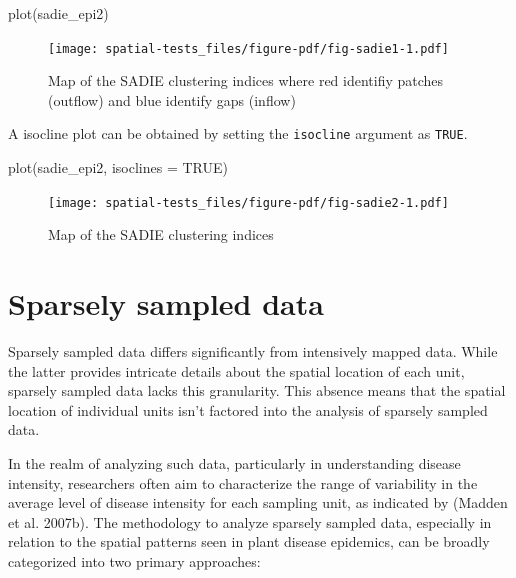 \documentclass[
  letterpaper,
]{book}
\newenvironment{Shaded}{\begin{snugshade}}{\end{snugshade}}
\newcommand{\AttributeTok}[1]{\textcolor[rgb]{0.40,0.45,0.13}{#1}}
\newcommand{\ConstantTok}[1]{\textcolor[rgb]{0.56,0.35,0.01}{#1}}
\newcommand{\FunctionTok}[1]{\textcolor[rgb]{0.28,0.35,0.67}{#1}}
\newcommand{\NormalTok}[1]{\textcolor[rgb]{0.00,0.23,0.31}{#1}}
\begin{document}
\begin{Shaded}
\begin{Highlighting}[]
\FunctionTok{plot}\NormalTok{(sadie\_epi2) }
\end{Highlighting}
\end{Shaded}

\begin{figure}[H]

{\centering \texttt{[image: spatial-tests\_files/figure-pdf/fig-sadie1-1.pdf]}

}

\caption{\label{fig-sadie1}Map of the SADIE clustering indices where red
identifiy patches (outflow) and blue identify gaps (inflow)}

\end{figure}

A isocline plot can be obtained by setting the \texttt{isocline}
argument as \texttt{TRUE}.

\begin{Shaded}
\begin{Highlighting}[]
\FunctionTok{plot}\NormalTok{(sadie\_epi2, }\AttributeTok{isoclines =} \ConstantTok{TRUE}\NormalTok{)}
\end{Highlighting}
\end{Shaded}

\begin{figure}[H]

{\centering \texttt{[image: spatial-tests\_files/figure-pdf/fig-sadie2-1.pdf]}

}

\caption{\label{fig-sadie2}Map of the SADIE clustering indices}

\end{figure}

\hypertarget{sparsely-sampled-data}{%
\section{Sparsely sampled data}\label{sparsely-sampled-data}}

Sparsely sampled data differs significantly from intensively mapped
data. While the latter provides intricate details about the spatial
location of each unit, sparsely sampled data lacks this granularity.
This absence means that the spatial location of individual units isn't
factored into the analysis of sparsely sampled data.

In the realm of analyzing such data, particularly in understanding
disease intensity, researchers often aim to characterize the range of
variability in the average level of disease intensity for each sampling
unit, as indicated by (Madden et al. 2007b). The methodology to analyze
sparsely sampled data, especially in relation to the spatial patterns
seen in plant disease epidemics, can be broadly categorized into two
primary approaches:
\end{document}
